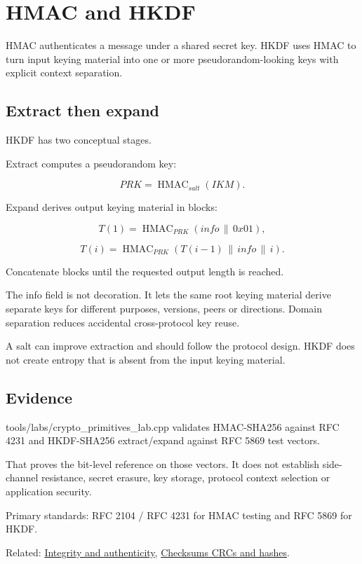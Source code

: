 \hypertarget{appendix-50af792c9da7}{}
\section{HMAC and HKDF}\label{appendix-50af792c9da7-hmac-and-hkdf}

HMAC authenticates a message under a shared secret key. HKDF uses HMAC to turn input keying material into one or more pseudorandom-looking keys with explicit context separation.

\subsection{Extract then expand}\label{appendix-50af792c9da7-extract-then-expand}

HKDF has two conceptual stages.

Extract computes a pseudorandom key:

\[
PRK=\operatorname{HMAC}_{salt}(IKM).
\]

Expand derives output keying material in blocks:

\[
T(1)=\operatorname{HMAC}_{PRK}(info\,\|\,0x01),
\]

\[
T(i)=\operatorname{HMAC}_{PRK}(T(i-1)\,\|\,info\,\|\,i).
\]

Concatenate blocks until the requested output length is reached.

The info field is not decoration. It lets the same root keying material derive separate keys for different purposes, versions, peers or directions. Domain separation reduces accidental cross-protocol key reuse.

A salt can improve extraction and should follow the protocol design. HKDF does not create entropy that is absent from the input keying material.

\subsection{Evidence}\label{appendix-50af792c9da7-evidence}

tools/labs/crypto\_primitives\_lab.cpp validates HMAC-SHA256 against RFC 4231 and HKDF-SHA256 extract/expand against RFC 5869 test vectors.

That proves the bit-level reference on those vectors. It does not establish side-channel resistance, secret erasure, key storage, protocol context selection or application security.

Primary standards: RFC 2104 / RFC 4231 for HMAC testing and RFC 5869 for HKDF.

Related: \hyperref[appendix-cbe594d1ab0a]{Integrity and authenticity}, \hyperref[appendix-ed338677de0a]{Checksums CRCs and hashes}.
